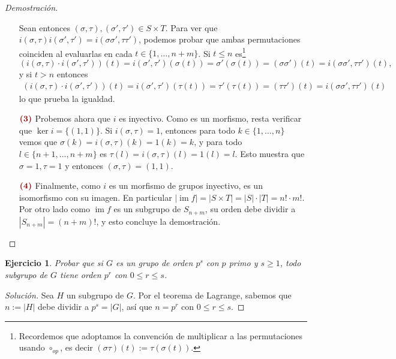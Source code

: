 \documentclass[11pt]{article}
\theoremstyle{colored}
\newtheorem{exercise}{Ejercicio}
\newcommand{\im}{\operatorname{im}}
\newcommand{\paint}[1]{\color{color}{#1}}
\newcommand{\tpaint}[1]{\paint{\textbf{#1}}}
\begin{document}
\begin{proof}[Demostración]
\begin{itemize}[listparindent = \parindent]
Sean entonces $(\sigma, \tau), (\sigma',\tau') \in S\times T$. Para ver que $i(\sigma,\tau)i(\sigma',\tau') = i(\sigma\sigma',\tau\tau')$, podemos probar que ambas permutaciones coinciden al evaluarlas en cada $t \in \{1,\dots, n+m\}$. Si $t \leq n$ es\footnote{Recordemos que adoptamos la convención de multiplicar a las permutaciones usando $\circ_{op}$, es decir $(\sigma\tau)(t) := \tau(\sigma(t))$.}
\[
(i(\sigma, \tau)\cdot i(\sigma',\tau'))(t) = i(\sigma', \tau')(\sigma(t)) = \sigma'(\sigma(t)) = (\sigma\sigma')(t) = i(\sigma\sigma', \tau\tau')(t),
\]
y si $t > n$ entonces
\begin{align*}
(i(\sigma, \tau)\cdot i(\sigma',\tau'))(t) = i(\sigma', \tau')(\tau(t)) = \tau'(\tau(t)) = (\tau\tau')(t) = i(\sigma\sigma', \tau\tau')(t)
\end{align*}
lo que prueba la igualdad.
\item[$\tpaint{(3)}$] Probemos ahora que $i$ es inyectivo. Como es un morfismo, resta verificar que $\ker i = \{(1,1)\}$. Si $i(\sigma, \tau) = 1$, entonces para todo $k \in \{1,\dots, n\}$ vemos que $\sigma(k) = i(\sigma, \tau)(k) = 1(k) = k$, y para todo $l \in \{n+1,\dots, n+m\}$ es $\tau(l) = i(\sigma, \tau)(l) = 1(l) = l$. Esto muestra que $\sigma = 1, \tau = 1$ y entonces $(\sigma, \tau) = (1,1)$.
\item[$\tpaint{(4)}$] Finalmente, como $i$ es un morfismo de grupos inyectivo, es un isomorfismo con su imagen. En particular $|\im f| = |S \times T| = |S| \cdot |T| = n! \cdot m!$. Por otro lado como $\im f$ es un subgrupo de $S_{n+m}$, su orden debe dividir a $|S_{n+m}| = (n+m)!$, y esto concluye la demostración.
\end{itemize}
\end{proof}

\begin{exercise} Probar que si $G$ es un grupo de orden $p^s$ con $p$ primo y $s \geq 1$, todo subgrupo de $G$ tiene orden $p^r$ con $0 \leq r \leq s$.
\end{exercise}
\begin{proof}[Solución] Sea $H$ un subgrupo de $G$. Por el teorema de Lagrange, sabemos que $n := |H|$ debe dividir a $p^s = |G|$, así que $n = p^r $ con $0 \leq r  \leq s$. 
\end{proof}
\end{document}
